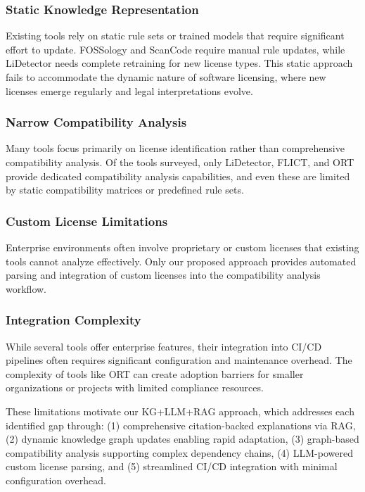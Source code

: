 \documentclass[9pt,twocolumn]{article}
\begin{document}
\subsubsection{Static Knowledge Representation}
Existing tools rely on static rule sets or trained models that require significant effort to update. FOSSology and ScanCode require manual rule updates, while LiDetector needs complete retraining for new license types. This static approach fails to accommodate the dynamic nature of software licensing, where new licenses emerge regularly and legal interpretations evolve.

\subsubsection{Narrow Compatibility Analysis}
Many tools focus primarily on license identification rather than comprehensive compatibility analysis. Of the tools surveyed, only LiDetector, FLICT, and ORT provide dedicated compatibility analysis capabilities, and even these are limited by static compatibility matrices or predefined rule sets.

\subsubsection{Custom License Limitations}
Enterprise environments often involve proprietary or custom licenses that existing tools cannot analyze effectively. Only our proposed approach provides automated parsing and integration of custom licenses into the compatibility analysis workflow.

\subsubsection{Integration Complexity}
While several tools offer enterprise features, their integration into CI/CD pipelines often requires significant configuration and maintenance overhead. The complexity of tools like ORT can create adoption barriers for smaller organizations or projects with limited compliance resources.

These limitations motivate our KG+LLM+RAG approach, which addresses each identified gap through: (1) comprehensive citation-backed explanations via RAG, (2) dynamic knowledge graph updates enabling rapid adaptation, (3) graph-based compatibility analysis supporting complex dependency chains, (4) LLM-powered custom license parsing, and (5) streamlined CI/CD integration with minimal configuration overhead.
\end{document}
